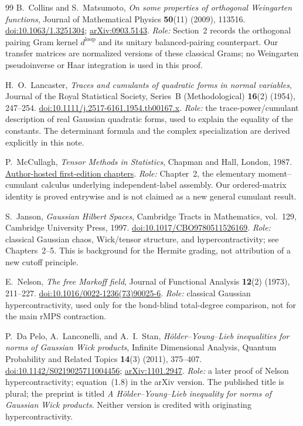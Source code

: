 \documentclass[11pt]{article}
\numberwithin{equation}{section}
\theoremstyle{definition}\newtheorem{definition}[theorem]{Definition}
\theoremstyle{remark}\newtheorem{remark}[theorem]{Remark}
\begin{document}
\begin{thebibliography}{99}
B.~Collins and S.~Matsumoto,
\emph{On some properties of orthogonal Weingarten functions},
Journal of Mathematical Physics \textbf{50}(11) (2009), 113516.
\href{https://doi.org/10.1063/1.3251304}{doi:10.1063/1.3251304};
\href{https://arxiv.org/abs/0903.5143}{arXiv:0903.5143}.
\textit{Role:} Section~2 records the orthogonal pairing Gram kernel
$d^{\mathrm{loop}}$ and its unitary balanced-pairing counterpart. Our transfer
matrices are normalized versions of these classical Grams; no Weingarten
pseudoinverse or Haar integration is used in this proof.

H.~O.~Lancaster,
\emph{Traces and cumulants of quadratic forms in normal variables},
Journal of the Royal Statistical Society, Series~B (Methodological)
\textbf{16}(2) (1954), 247--254.
\href{https://doi.org/10.1111/j.2517-6161.1954.tb00167.x}{doi:10.1111/j.2517-6161.1954.tb00167.x}.
\textit{Role:} the trace-power/cumulant description of real Gaussian quadratic
forms, used to explain the equality of the constants. The determinant formula
and the complex specialization are derived explicitly in this note.

P.~McCullagh,
\emph{Tensor Methods in Statistics}, Chapman and Hall, London, 1987.
\href{https://www.stat.uchicago.edu/~pmcc/tensorbook/}{Author-hosted first-edition chapters}.
\textit{Role:} Chapter~2, the elementary moment--cumulant calculus underlying
independent-label assembly. Our ordered-matrix identity is proved entrywise
and is not claimed as a new general cumulant result.

S.~Janson,
\emph{Gaussian Hilbert Spaces}, Cambridge Tracts in Mathematics, vol.~129,
Cambridge University Press, 1997.
\href{https://doi.org/10.1017/CBO9780511526169}{doi:10.1017/CBO9780511526169}.
\textit{Role:} classical Gaussian chaos, Wick/tensor structure, and
hypercontractivity; see Chapters~2--5. This is background for the Hermite
grading, not attribution of a new cutoff principle.

E.~Nelson,
\emph{The free Markoff field},
Journal of Functional Analysis \textbf{12}(2) (1973), 211--227.
\href{https://doi.org/10.1016/0022-1236(73)90025-6}{doi:10.1016/0022-1236(73)90025-6}.
\textit{Role:} classical Gaussian hypercontractivity, used only for the
bond-blind total-degree comparison, not for the main rMPS contraction.

P.~Da Pelo, A.~Lanconelli, and A.~I.~Stan,
\emph{H\"older--Young--Lieb inequalities for norms of Gaussian Wick products},
Infinite Dimensional Analysis, Quantum Probability and Related Topics
\textbf{14}(3) (2011), 375--407.
\href{https://doi.org/10.1142/S0219025711004456}{doi:10.1142/S0219025711004456};
\href{https://arxiv.org/abs/1101.2947}{arXiv:1101.2947}.
\textit{Role:} a later proof of Nelson hypercontractivity; equation~(1.8) in
the arXiv version. The published title is plural; the preprint is titled
\emph{A H\"older--Young--Lieb inequality for norms of Gaussian Wick products}.
Neither version is credited with originating hypercontractivity.


\end{thebibliography}
\end{document}
